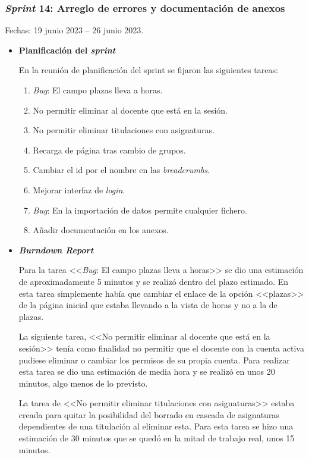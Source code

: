 \subsubsection{\textit{Sprint} 14: Arreglo de errores y documentación de anexos}
Fechas: 19 junio 2023 -- 26 junio 2023.
\begin{itemize}
\item\textbf{Planificación del \textit{sprint}}

En la reunión de planificación del sprint se fijaron las siguientes tareas:
\begin{enumerate}
		\item \textit{Bug}: El campo plazas lleva a horas.
		\item No permitir eliminar al docente que está en la sesión.
		\item No permitir eliminar titulaciones con asignaturas.
		\item Recarga de página tras cambio de grupos.
		\item Cambiar el id por el nombre en las \textit{breadcrumbs}.
		\item Mejorar interfaz de \textit{login}.
		\item \textit{Bug}: En la importación de datos permite cualquier fichero.
		\item Añadir documentación en los anexos.

\end{enumerate}

\item\textbf{\textit{Burndown Report}}

Para la tarea <<\textit{Bug}: El campo plazas lleva a horas>> se dio una estimación de aproximadamente 5 minutos y se realizó dentro del plazo estimado.
En esta tarea simplemente había que cambiar el enlace de la opción <<plazas>> de la página inicial que estaba llevando a la vista de horas y no a la de plazas.

La siguiente tarea, <<No permitir eliminar al docente que está en la sesión>> tenía como finalidad no permitir que el docente con la cuenta activa pudiese eliminar o cambiar los permisos de su propia cuenta.
Para realizar esta tarea se dio una estimación de media hora y se realizó en unos 20 minutos, algo menos de lo previsto.

La tarea de <<No permitir eliminar titulaciones con asignaturas>> estaba creada para quitar la posibilidad del borrado en cascada de asignaturas dependientes de una titulación al eliminar esta.
Para esta tarea se hizo una estimación de 30 minutos que se quedó en la mitad de trabajo real, unos 15 minutos.


\end{itemize}
